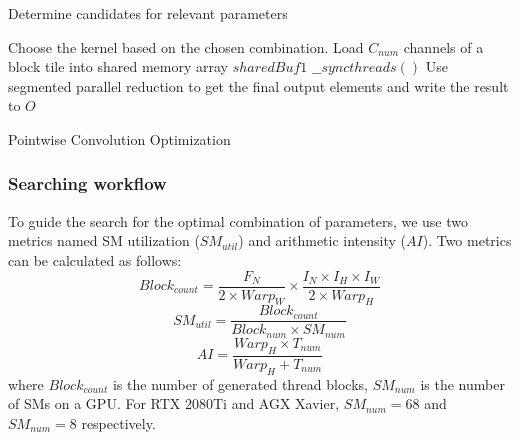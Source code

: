 \begin{algorithm}[t!]
    \small
        Determine candidates for relevant parameters\;
        
        Choose the kernel based on the chosen combination.\;
        Load $C_{num}$ channels of a block tile into shared memory array $sharedBuf1$\;
        $\_\_syncthreads()$\;
        Use segmented parallel reduction to get the final output elements and write the result to $O$\;
        \caption{Pointwise Convolution Optimization}
        \label{algo:pwalgo}
\end{algorithm}
\subsubsection{Searching workflow}
To guide the search for the optimal combination of parameters, we use two metrics named SM utilization ($SM_{util}$) and arithmetic intensity ($AI$).
Two metrics can be calculated as follows:
\begin{equation}\nonumber
    Block_{count}=\frac{F_N}{2 \times Warp_W} \times \frac{I_N \times I_H \times I_W}{2 \times Warp_H}
\end{equation}
\begin{equation}
    SM_{util}=\frac{Block_{count}}{Block_{num}\times SM_{num}}
    \label{fo:smutil}
\end{equation}
\begin{equation}
    AI = \frac{Warp_H \times T_{num}}{Warp_H+T_{num}}
    \label{fo:diff}
\end{equation}
where $Block_{count}$ is the number of generated thread blocks, $SM_{num}$ is the number of SMs on a GPU. For RTX 2080Ti and AGX Xavier, $SM_{num}=68$ and $SM_{num}=8$ respectively.

